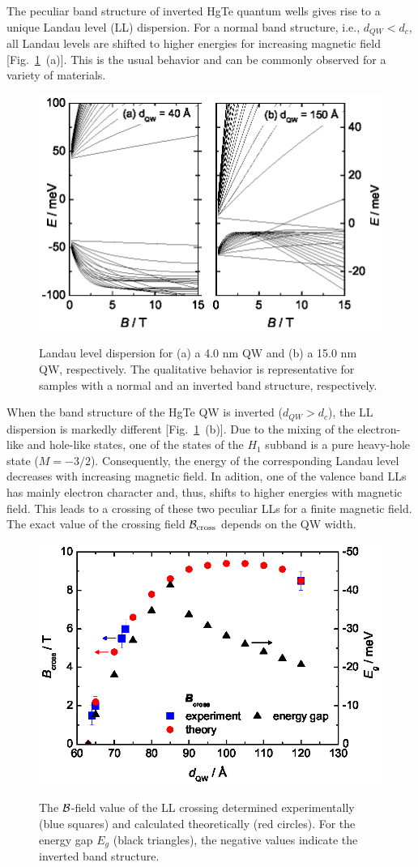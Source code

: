 \documentclass{article}
\begin{document}
The peculiar band structure of inverted HgTe quantum wells gives rise to a
unique Landau level (LL) dispersion. For a normal band structure,
i.e., $d_{QW}<d_{c}$, all Landau levels are shifted to higher
energies for increasing magnetic field [Fig.~\ref{FigLLs}~(a)]. This
is the usual behavior and can be commonly observed for a variety of
materials.
\begin{figure}[hbt]
\centering
 \includegraphics[width=0.8\linewidth]{80608Fig09.eps}\\
 \caption{Landau level dispersion for (a) a 4.0 nm
 QW and (b) a 15.0 nm QW, respectively. The qualitative behavior is
 representative for samples with a normal and an inverted band
 structure, respectively.}
 \label{FigLLs}
\end{figure}
When the band structure of the HgTe QW is inverted ($d_{QW}>d_{c}$),
the LL dispersion is markedly different [Fig.~\ref{FigLLs}~(b)].
Due to the mixing of the
electron-like and hole-like states, one of the states of the $H_1$
subband is a pure heavy-hole state ($M=-3/2$). Consequently, the
energy of the corresponding Landau level decreases with increasing magnetic
field. In adition, one of the valence band LLs has mainly electron
character and, thus, shifts to higher energies with magnetic field.
This leads to a crossing of these two peculiar LLs for a finite
magnetic field. The exact value of the crossing field ${\cal{B}}_{\rm
cross}$ depends on the QW width.
\begin{figure}[hbt]
\centering
 \includegraphics[width=0.8\linewidth]{80608Fig10.eps}\\
 \caption{The ${\cal{B}}$-field value of the LL crossing determined
 experimentally (blue squares) and calculated theoretically (red
 circles). For the energy gap $E_g$ (black triangles), the negative
 values indicate the inverted band structure.}
 \label{FigBcross}
\end{figure}
\end{document}
